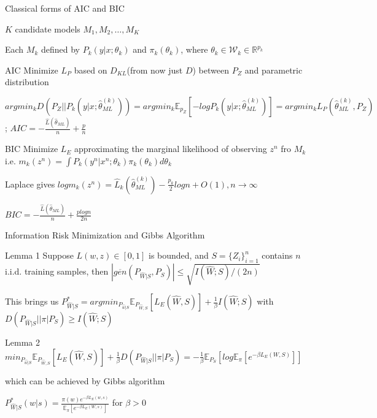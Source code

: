 \documentclass{beamer}
\begin{document}
\begin{frame}{Classical forms of AIC and BIC}

$K$ candidate models $M_1,M_2,\dots,M_K$

Each $M_k$ defined by $P_k(y|x;\theta_k)$ and $\pi_k(\theta_k)$, where $\theta_k \in \mathcal{W}_k \in \mathbb{R}^{p_k}$


\begin{block}{AIC}
Minimize $L_P$ based on $D_{KL}$(from now just $D$) between $P_Z$ and parametric distribution

$argmin_k D(P_Z||P_k(y|x;\hat{\theta}_{ML}^{(k)}))=argmin_k \mathbb{E}_{p_Z}[-logP_k(y|x;\hat{\theta}_{ML}^{(k)})]=argmin_k L_P(\hat{\theta}_{ML}^{(k)}, P_Z)$; $AIC=-\frac{\hat{L}(\hat{\theta}_{ML})}{n} + \frac{p}{n}$

\end{block}

\begin{block}{BIC}
Minimize $L_E$ approximating the marginal likelihood of observing $z^n$ fro $M_k$ i.e. $m_k(z^n)=\int P_k(y^n|x^n;\theta_k) \pi_k(\theta_k) d \theta_k$

Laplace gives $log m_k(z^n) = \hat{L}_k(\hat{\theta}_{ML}^{(k)})-\frac{p_k}{2} log n+ O(1),n \rightarrow \infty$

$BIC=-\frac{\hat{L}(\hat{\theta}_{ML})}{n}+\frac{p log n}{2n}$

\end{block}

\end{frame}

\begin{frame}{Information Risk Minimization and Gibbs Algorithm}

\begin{block}{Lemma 1}
Suppose $L(w,z) \in [0,1]$ is bounded, and $S=\{Z_i \}_{i=1}^n$ contains $n$ i.i.d. training samples, then $|\overline{gen}(P_{\hat{W}|S}, P_S)| \le \sqrt{I(\hat{W};S) / (2n)}$
\end{block}

This brings us $P^*_{\hat{W}|S} = argmin_{P_{\hat{w}|S}} \mathbb{E}_{P_{\hat{W},S}} [L_E(\hat{W},S)] + \frac{1}{\beta} I(\hat{W};S)$ with $D(P_{\hat{W}|S} || \pi |P_S) \ge I(\hat{W};S)$

\begin{block}{Lemma 2}
    $min_{P_{\hat{w}|S}} \mathbb{E}_{P_{\hat{W},S}} [L_E(\hat{W},S)] + \frac{1}{\beta} D(P_{\hat{W}|S} || \pi |P_S)=-\frac{1}{\beta} \mathbb{E}_{P_S} [log \mathbb{E}_{\pi}[e^{-\beta L_E(W,S)}]]$

    which can be achieved by Gibbs algorithm

    $P^*_{\hat{W}|S}(w|s)=\frac{\pi(w) e^{-\beta L_E(w,s)}}{\mathbb{E}_{\pi}[e^{-\beta L_E(W,s)}]}$ for $\beta>0$
\end{block}

\end{frame}
\end{document}
